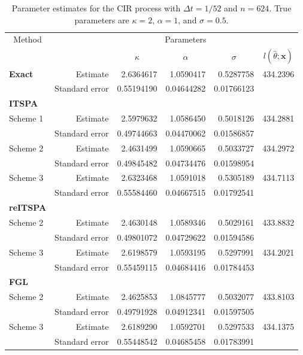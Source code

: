 \begin{table}
	\newcommand{\ra}[1]{\renewcommand{\arraystretch}{#1}}
	\ra{1.3}
	\centering
	\begin{tabular}{@{}lrrrrr@{}}
		\toprule
		\multicolumn{1}{c}{Method}& & \multicolumn{3}{c}{Parameters}\\
		\cmidrule{1-1} \cmidrule{3-5}
		& & \multicolumn{1}{c}{$\kappa$} & \multicolumn{1}{c}{$\alpha$} & \multicolumn{1}{c}{$\sigma$} &\multicolumn{1}{c}{$l(\hat{\theta};\mathbf{x})$} \\
		\midrule
		\textbf{Exact}& Estimate & 2.6364617 & 1.0590417& 0.5287758 & 434.2396 \\
		& Standard error & 0.55194190 & 0.04644282 & 0.01766123\\
		\textbf{ITSPA}\\
		Scheme 1& Estimate & 2.5979632  & 1.0586450   & 0.5018126 & 434.2881 \\
		& Standard error &  0.49744663&0.04470062& 0.01586857& \\
		Scheme 2& Estimate &  2.4631499 & 1.0590665 & 0.5033727& 434.2972\\
		& Standard error & 0.49845482& 0.04734476& 0.01598954& \\
		Scheme 3& Estimate & 2.6323468  &1.0591018 &0.5305189&434.7113 \\
		& Standard error & 0.55584460& 0.04667515& 0.01792541& \\
		\textbf{reITSPA}\\
		Scheme 2& Estimate &  2.4630148& 1.0589346 &0.5029161& 433.8832 \\
		& Standard error & 0.49801072&0.04729622&0.01594586& \\
		Scheme 3& Estimate & 2.6198579 & 1.0593195  &0.5297991& 434.2021 \\
		& Standard error & 0.55459115& 0.04684416&0.01784453& \\
		\textbf{FGL}\\
		Scheme 2 & Estimate& 2.4625853 & 1.0845777 &0.5032077 & 433.8103\\
		&	Standard error & 0.49791928 & 0.04912341 & 0.01597505\\
		Scheme 3 & Estimate&2.6189290 &1.0592701&0.5297533&434.1375\\
		&	Standard error &0.55448542&0.04685458&0.01783991\\
		\bottomrule
	\end{tabular}
	\caption[Parameter estimates: Cox-Ingersoll-Ross process.] {Parameter estimates for the CIR process with $\Delta t=1/52$ and $n=624$.
		True parameters are $\kappa=2$, $\alpha=1$, and $\sigma=0.5$.}
	\label{Chap6.2 CIR table}
\end{table}



